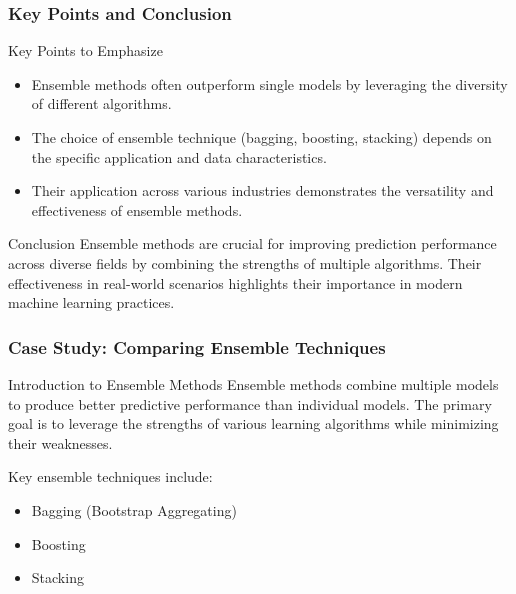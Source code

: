 \documentclass[aspectratio=169]{beamer}
\begin{document}
\begin{frame}[fragile]
    \frametitle{Key Points and Conclusion}
    \begin{block}{Key Points to Emphasize}
        \begin{itemize}
            \item Ensemble methods often outperform single models by leveraging the diversity of different algorithms.
            \item The choice of ensemble technique (bagging, boosting, stacking) depends on the specific application and data characteristics.
            \item Their application across various industries demonstrates the versatility and effectiveness of ensemble methods.
        \end{itemize}
    \end{block}
    
    \begin{block}{Conclusion}
        Ensemble methods are crucial for improving prediction performance across diverse fields by combining the strengths of multiple algorithms. Their effectiveness in real-world scenarios highlights their importance in modern machine learning practices.
    \end{block}
\end{frame}

\begin{frame}
    \frametitle{Case Study: Comparing Ensemble Techniques}
    
    \begin{block}{Introduction to Ensemble Methods}
        Ensemble methods combine multiple models to produce better predictive performance than individual models. 
        The primary goal is to leverage the strengths of various learning algorithms while minimizing their weaknesses.
    \end{block}
    
    Key ensemble techniques include:
    \begin{itemize}
        \item Bagging (Bootstrap Aggregating)
        \item Boosting
        \item Stacking
    \end{itemize}
\end{frame}
\end{document}

